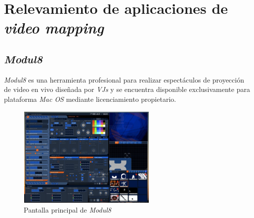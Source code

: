 ﻿\chapter{Relevamiento de aplicaciones de \emph{video mapping}}
\section{\emph{Modul8}}
\emph{Modul8}\cite{Module8} es una herramienta profesional para realizar espectáculos de proyección de video en vivo diseñada por \emph{VJs} y se encuentra disponible exclusivamente para plataforma \emph{Mac OS} mediante licenciamiento propietario.

\begin{figure}[H]
  \centering
    \includegraphics[width=0.6\textwidth]{./Cap3_aplicaciones/apps-modul8.png}
  \caption{Pantalla principal de \emph{Modul8}}
  \label{fig:Apps-Module8}
\end{figure}

